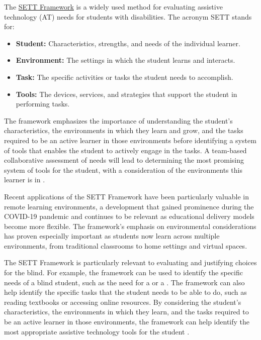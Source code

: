 The \href{https://www.joyzabala.com/links-resources}{SETT Framework} \supercite{ZabalaSETT, MNSETT} is a widely used method for evaluating assistive technology (AT) needs for students with disabilities. The acronym SETT stands for:

\begin{itemize}
	\item \textbf{Student:} Characteristics, strengths, and needs of the individual learner.
	\item \textbf{Environment:} The settings in which the student learns and interacts.
	\item \textbf{Task:} The specific activities or tasks the student needs to accomplish.
	\item \textbf{Tools:} The devices, services, and strategies that support the student in performing tasks.
\end{itemize}

The framework emphasizes the importance of understanding the student's characteristics, the environments in which they learn and grow, and the tasks required to be an active learner in those environments before identifying a system of tools that enables the student to actively engage in the tasks. A team-based collaborative assessment of needs will lead to determining the most promising system of tools for the student, with a consideration of the environments this learner is in \supercite{Hollingshead2020}.

Recent applications of the SETT Framework have been particularly valuable in remote learning environments, a development that gained prominence during the COVID-19 pandemic and continues to be relevant as educational delivery models become more flexible. The framework's emphasis on environmental considerations has proven especially important as students now learn across multiple environments, from traditional classrooms to home settings and virtual spaces.

The SETT Framework is particularly relevant to evaluating and justifying  choices for the blind. For example, the framework can be used to identify the specific needs of a blind student, such as the need for a  or a . The framework can also help identify the specific tasks that the student needs to be able to do, such as reading textbooks or accessing online resources. By considering the student's characteristics, the environments in which they learn, and the tasks required to be an active learner in those environments, the framework can help identify the most appropriate assistive technology tools for the student \supercite{Zabala2005, Zabala2018}.

